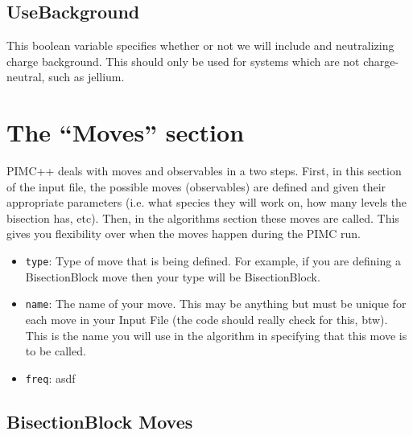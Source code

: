 \documentclass{book}
\begin{document}
\subsection{UseBackground}
This boolean variable specifies whether or not we will include and
neutralizing charge background.  This should only be used for systems
which are not charge-neutral, such as jellium.

\section{The ``Moves'' section}
PIMC++ deals with moves and observables in a two steps. First, in this
section of the input file, the possible moves (observables) are
defined and given their appropriate parameters (i.e. what species they
will work on, how many levels the bisection has, etc).  Then, in the
algorithms section these moves are called.  This gives you flexibility
over when the moves happen during the PIMC run.  

\begin{itemize}
   \item \texttt{type}:  Type of move that is being
   defined.  For example, if you are defining a BisectionBlock move
   then your type will be BisectionBlock.

   \item \texttt{name}:  The name of your move. This may be anything
   but must be unique for each move in your Input File (the code should
   really check for this, btw).  This is the name you will use in the
   algorithm in specifying that this move is to be called.

   \item \texttt{freq}:  asdf
\end{itemize}

\subsection{BisectionBlock Moves}
 
\end{document}
